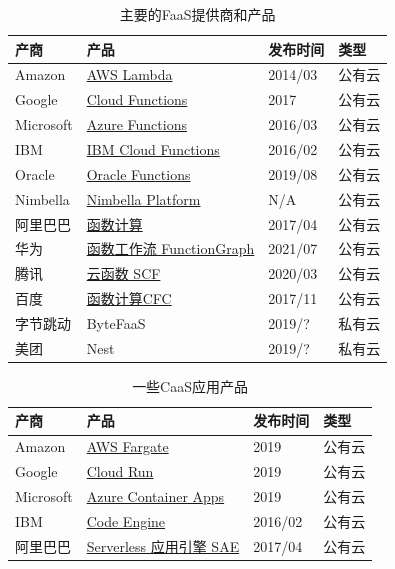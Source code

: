 \begin{table}[ht]
\centering
\begin{tabularx}{\textwidth}{|l|l|l|X|}
\toprule
\textbf{产商} & \textbf{产品} & \textbf{发布时间} & \textbf{类型} \\
\midrule
Amazon & \href{https://aws.amazon.com/cn/lambda/}{AWS Lambda} & 2014/03  &公有云 \\
\hline
Google & \href{https://cloud.google.com/functions}{Cloud Functions}& 2017 &公有云 \\
\hline
Microsoft & \href{https://azure.microsoft.com/en-us/products/functions/}{Azure Functions} & 2016/03 &公有云\\
\hline
IBM & \href{https://cloud.ibm.com/functions}{IBM Cloud Functions} &2016/02 &公有云\\
\hline
Oracle & \href{https://www.oracle.com/hk/cloud/cloud-native/functions/}{Oracle Functions} & 2019/08   &公有云\\
\hline
Nimbella & \href{https://nimbella.com/platform}{Nimbella Platform} & N/A  &公有云\\
\hline
阿里巴巴 & \href{https://www.alibabacloud.com/zh/product/function-compute}{函数计算}& 2017/04  &公有云\\
\hline
华为 &\href{https://www.huaweicloud.com/product/functiongraph.html}{函数工作流 FunctionGraph}& 2021/07   &公有云 \\
\hline
腾讯 & \href{https://cloud.tencent.com/product/scf}{云函数 SCF}& 2020/03  & 公有云 \\
\hline
百度 & \href{https://cloud.baidu.com/product/cfc.html}{函数计算CFC} & 2017/11 &公有云 \\
\hline
字节跳动 & ByteFaaS & 2019/? &私有云 \\
\hline
美团 & Nest & 2019/? &私有云 \\
\bottomrule
\end{tabularx}

\caption{主要的FaaS提供商和产品}
\label{table:serverless-faas-venders}
\end{table}


\begin{table}[ht]
\centering
\begin{tabularx}{\textwidth}{|l|l|l|X|}
\toprule
\textbf{产商} & \textbf{产品} & \textbf{发布时间} & \textbf{类型} \\
\midrule
Amazon & 
\href{https://aws.amazon.com/cn/fargate/}{AWS Fargate}& 2019 &公有云 \\
\hline
Google & 
\href{https://cloud.google.com/run}{Cloud Run}& 2019 &公有云 \\
\hline
Microsoft & 
\href{https://azure.microsoft.com/en-us/products/container-apps/}{Azure Container Apps}& 2019 &公有云 \\
\hline
IBM & \href{https://www.ibm.com/cloud/code-engine}{Code Engine} &2016/02 &公有云\\
\hline
阿里巴巴 & \href{https://www.aliyun.com/product/sae}{Serverless 应用引擎 SAE}& 2017/04  &公有云\\
\bottomrule
\end{tabularx}

\caption{一些CaaS应用产品}
\label{table:serverless-caas-venders}
\end{table}

